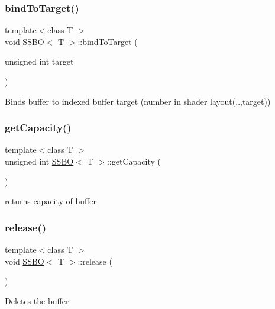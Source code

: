 \subsubsection{\texorpdfstring{bindToTarget()}{bindToTarget()}}
{\footnotesize\ttfamily template$<$class T $>$ \\
void \mbox{\hyperlink{class_s_s_b_o}{S\+S\+BO}}$<$ T $>$\+::bind\+To\+Target (\begin{DoxyParamCaption}\item[{unsigned int}]{target }\end{DoxyParamCaption})}

Binds buffer to indexed buffer target (number in shader layout(..,target)) \mbox{\label{class_s_s_b_o_aaf7637fa7d155a10f0ae3ffa0921e770}} 
\subsubsection{\texorpdfstring{getCapacity()}{getCapacity()}}
{\footnotesize\ttfamily template$<$class T $>$ \\
unsigned int \mbox{\hyperlink{class_s_s_b_o}{S\+S\+BO}}$<$ T $>$\+::get\+Capacity (\begin{DoxyParamCaption}{ }\end{DoxyParamCaption})}

returns capacity of buffer \mbox{\label{class_s_s_b_o_af82e409e9d2d40913bed3dfb903d1b14}} 
\subsubsection{\texorpdfstring{release()}{release()}}
{\footnotesize\ttfamily template$<$class T $>$ \\
void \mbox{\hyperlink{class_s_s_b_o}{S\+S\+BO}}$<$ T $>$\+::release (\begin{DoxyParamCaption}{ }\end{DoxyParamCaption})}

Deletes the buffer \mbox{\label{class_s_s_b_o_ac2321b5116f5765cff5c0c19a6f05ed4}} 

